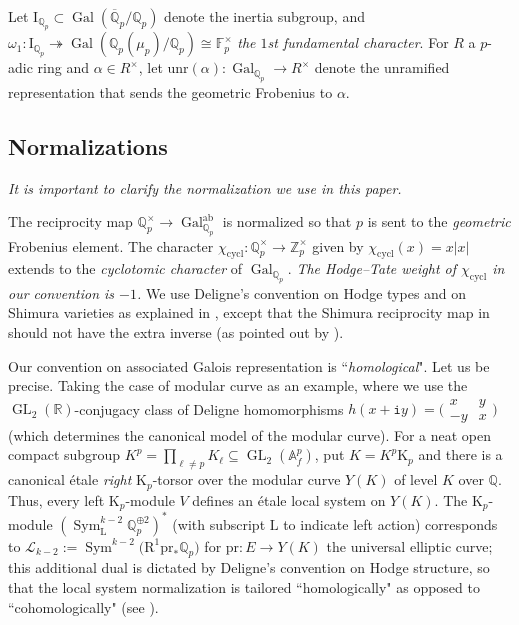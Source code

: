 \documentclass[12pt]{amsart}
\theoremstyle{definition}
\numberwithin{equation}{subsection}
\def\calL{\mathcal{L}}
\def\AAA{\mathbb{A}}
\def\FF{\mathbb{F}}
\def\QQ{\mathbb{Q}}
\def\RR{\mathbb{R}}
\def\ZZ{\mathbb{Z}}
\def\rmI{\mathrm{I}}
\def\rmK{\mathrm{K}}
\def\rmL{\mathrm{L}}
\def\rmR{\mathrm{R}}
\def\tti{\mathtt{i}}
\DeclareMathOperator{\Gal}{Gal}
\DeclareMathOperator{\GL}{GL}
\DeclareMathOperator{\Sym}{Sym}
\newcommand{\cycl}{\mathrm{cycl}}
\newcommand{\unr}{\mathrm{unr}}
\newcommand{\pr}{\mathrm{pr}}
\newcommand{\Matrix}[4]{{\big(\begin{smallmatrix}#1&#2\\#3& #4\end{smallmatrix} \big)}}
\begin{document}
\medskip
Let $\rmI_{\QQ_p}\subset \Gal(\overline{\QQ}_p/\QQ_p)$ denote the inertia subgroup, and  $\omega_1: \rmI_{\QQ_p} \twoheadrightarrow\Gal(\QQ_p(\mu_p)/\QQ_p) \cong \FF_p^\times$ \emph{the $1$st fundamental character}. For $R$ a $p$-adic ring and $\alpha \in R^\times$, let $\unr(\alpha): \Gal_{\QQ_p} \to R^\times $ denote the unramified representation that sends the geometric Frobenius to $\alpha$.

\subsection{Normalizations}
\label{S:normalization}
\emph{It is important to clarify the normalization we use in this paper.}

The reciprocity map $\QQ_p^\times \to \Gal_{\QQ_p}^\mathrm{ab}$ is normalized so that $p$ is sent to the \emph{geometric} Frobenius element.
The character $\chi_\cycl: \QQ_p^\times \to \ZZ_p^\times$ given by $\chi_\cycl(x) = x|x|$ extends to the \emph{cyclotomic character} of $ \Gal_{\QQ_p}$. \emph{The Hodge--Tate weight of $\chi_\cycl$ in our convention is $-1$.}  We use Deligne's convention on Hodge types and on Shimura varieties as explained in \cite{deligne}, except that the Shimura reciprocity map in \cite[\S\,2.2.3]{deligne} should not have the extra inverse (as pointed out by \cite{milne}).

Our convention on associated Galois representation is ``\emph{homological}". Let us be precise.
Taking the case of modular curve as an example, where we use the $\GL_2(\RR)$-conjugacy class of Deligne homomorphisms $h(x+\tti y) = \Matrix xy{-y}x$ (which determines the canonical model of the modular curve).
For a neat open compact subgroup $K^p = \prod_{\ell \neq p} K_\ell \subseteq \GL_2(\AAA_f^p)$, put $K = K^p \rmK_p$ and there is a canonical \'etale \emph{right} $\rmK_p$-torsor over the modular curve $Y(K)$ of level $K$ over $\QQ$. Thus, every left $\rmK_p$-module $V$ defines an \'etale local system on $Y(K)$. The $\rmK_p$-module $(\Sym_{\rmL}^{k-2}\QQ_p^{\oplus 2})^*$ (with subscript $\rmL$ to indicate left action) corresponds to $\calL_{k-2}:=\Sym^{k-2} \big(\rmR^1\pr_*\QQ_p\big)$ for $\pr: E \to Y(K)$ the universal elliptic curve; this additional dual is dictated by Deligne's convention on Hodge structure, so that the local system normalization is tailored ``homologically" as opposed to ``cohomologically" (see \cite[Remarque~1.1.6]{deligne}).
\end{document}
